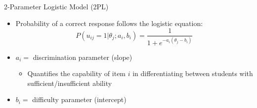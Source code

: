 \documentclass{beamer}
\theoremstyle{definition}
\begin{document}
\begin{frame}{2-Parameter Logistic Model (2PL)}
\begin{itemize}
  \item Probability of a correct response follows the logistic equation:
    \[P(u_{ij} = 1 | \theta_j; a_i, b_i) = \frac{1}{1 + e^{-a_i(\theta_j - b_i)}}\]
    \item<2-> $a_i =$ discrimination parameter (slope)
      \begin{itemize}
        \item Quantifies the capability of item $i$ in differentiating between students with sufficient/insufficient ability
      \end{itemize}
    \item<2-> $b_i =$ difficulty parameter (intercept)
\end{itemize}
\end{frame}
\end{document}
